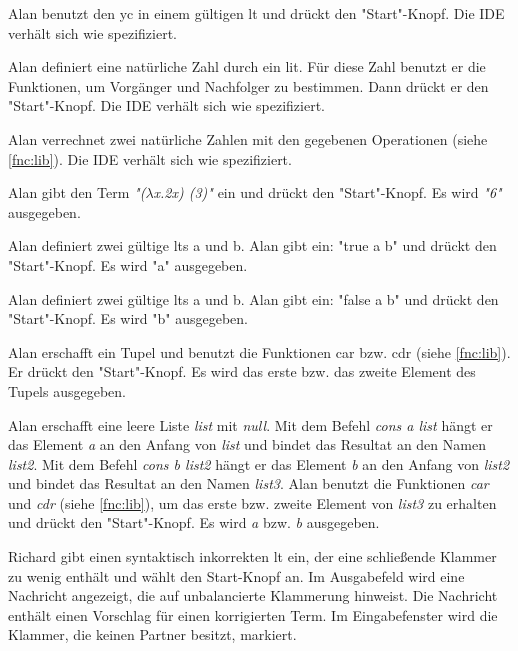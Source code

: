 \documentclass[parskip=full,11pt,twoside]{scrartcl}
\begin{document}
{
{Alan benutzt den \gls{yc} in einem gültigen \gls{lt} und drückt den "Start"-Knopf.}
{Die IDE verhält sich wie spezifiziert.}

{Alan definiert eine natürliche Zahl durch ein \gls{lit}.
 Für diese Zahl benutzt er die Funktionen, um Vorgänger und Nachfolger zu bestimmen.
 Dann drückt er den "Start"-Knopf.}
{Die IDE verhält sich wie spezifiziert.}

{Alan verrechnet zwei natürliche Zahlen mit den gegebenen Operationen (siehe \ref{fnc:lib}).}
{Die IDE verhält sich wie spezifiziert.}

{Alan gibt den Term \emph{"($\lambda$x.2x) (3)"} ein und drückt den "Start"-Knopf.}
{Es wird \emph{"6"} ausgegeben.}

{Alan definiert zwei gültige \glspl{lt} a und b.
 Alan gibt ein: "true a b" und drückt den "Start"-Knopf.}
{Es wird "a" ausgegeben.}

{Alan definiert zwei gültige \glspl{lt} a und b.
 Alan gibt ein: "false a b" und drückt den "Start"-Knopf.}
{Es wird "b" ausgegeben.}

{Alan erschafft ein Tupel und benutzt die Funktionen car bzw. cdr (siehe \ref{fnc:lib}).
 Er drückt den "Start"-Knopf.}
{Es wird das erste bzw. das zweite Element des Tupels ausgegeben.}

{Alan erschafft eine leere Liste \emph{list} mit \emph{null}. 
 Mit dem Befehl \emph{cons a list} hängt er das Element \emph{a} an den Anfang von \emph{list} und bindet das Resultat
 an den Namen \emph{list2}.
 Mit dem Befehl \emph{cons b list2} hängt er das Element \emph{b} an den Anfang von \emph{list2} und bindet das
 Resultat an den Namen \emph{list3}.
 Alan benutzt die Funktionen \emph{car} und \emph{cdr} (siehe \ref{fnc:lib}), um das erste bzw. zweite Element von \emph{list3}
 zu erhalten
 und drückt den "Start"-Knopf.}
{Es wird \emph{a} bzw. \emph{b} ausgegeben.}


{Richard gibt einen syntaktisch inkorrekten \gls{lt} ein, der eine schließende Klammer
zu wenig enthält und wählt den Start-Knopf an.}
{Im Ausgabefeld wird eine Nachricht angezeigt, die auf unbalancierte Klammerung hinweist.
Die Nachricht enthält einen Vorschlag für einen korrigierten Term. Im Eingabefenster wird
die Klammer, die keinen Partner besitzt, markiert.}

}
\end{document}
